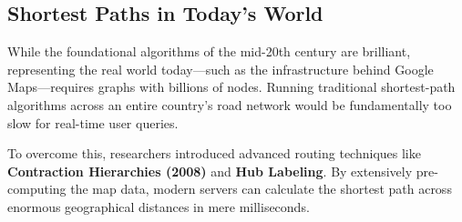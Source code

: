 \subsection{Shortest Paths in Today's World}
While the foundational algorithms of the mid-20th century are brilliant, representing the real world today—such as the infrastructure behind Google Maps—requires graphs with billions of nodes. Running traditional shortest-path algorithms across an entire country's road network would be fundamentally too slow for real-time user queries. 

To overcome this, researchers introduced advanced routing techniques like \textbf{Contraction Hierarchies (2008)} and \textbf{Hub Labeling}. By extensively pre-computing the map data, modern servers can calculate the shortest path across enormous geographical distances in mere milliseconds.